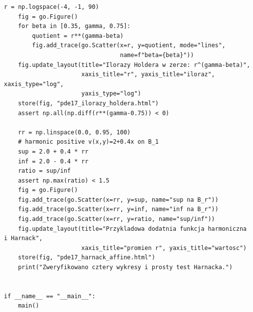 \begin{lstlisting}[style=pythonpde,caption={Mierzalne współczynniki, regularność Höldera i Harnack (Plotly)},label={code:pde17-plotly}]
    r = np.logspace(-4, -1, 90)
    fig = go.Figure()
    for beta in [0.35, gamma, 0.75]:
        quotient = r**(gamma-beta)
        fig.add_trace(go.Scatter(x=r, y=quotient, mode="lines",
                                 name=f"beta={beta}"))
    fig.update_layout(title="Ilorazy Holdera w zerze: r^(gamma-beta)",
                      xaxis_title="r", yaxis_title="iloraz", xaxis_type="log",
                      yaxis_type="log")
    store(fig, "pde17_ilorazy_holdera.html")
    assert np.all(np.diff(r**(gamma-0.75)) < 0)

    rr = np.linspace(0.0, 0.95, 100)
    # harmonic positive v(x,y)=2+0.4x on B_1
    sup = 2.0 + 0.4 * rr
    inf = 2.0 - 0.4 * rr
    ratio = sup/inf
    assert np.max(ratio) < 1.5
    fig = go.Figure()
    fig.add_trace(go.Scatter(x=rr, y=sup, name="sup na B_r"))
    fig.add_trace(go.Scatter(x=rr, y=inf, name="inf na B_r"))
    fig.add_trace(go.Scatter(x=rr, y=ratio, name="sup/inf"))
    fig.update_layout(title="Przykladowa dodatnia funkcja harmoniczna i Harnack",
                      xaxis_title="promien r", yaxis_title="wartosc")
    store(fig, "pde17_harnack_affine.html")
    print("Zweryfikowano cztery wykresy i prosty test Harnacka.")


if __name__ == "__main__":
    main()
\end{lstlisting}



